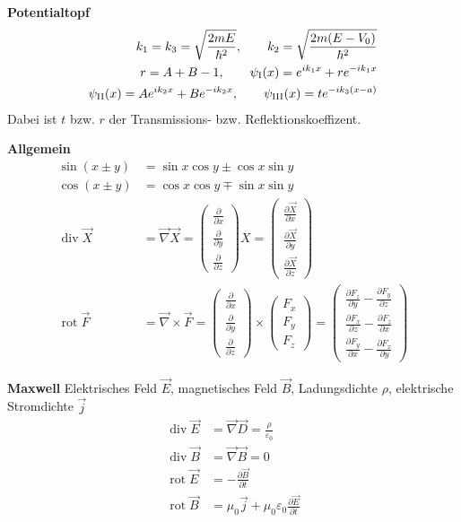 \documentclass[landscape,8pt]{scrartcl}
\newcommand{\myheading}[1]{\textbf{#1}}
\begin{document}
\begin{multicols}{3}
\myheading{Potentialtopf}
\begin{align*}
k_1 = k_3 = \sqrt{\frac{2mE}{\hbar^2}}, \qquad k_2 = \sqrt{\frac{2m(E-V_0)}{\hbar^2}} \\
r = A+B-1, \qquad \psi_\text I(x) = e^{ik_1x} + re^{-ik_1x} \\
\psi_\text{II}(x) = Ae^{ik_2x} + Be^{-ik_2x}, \qquad \psi_\text{III}(x) = t e^{-ik_3(x-a)}
\end{align*}
Dabei ist $t$ bzw. $r$ der Transmissions- bzw. Reflektionskoeffizent. 

\myheading{Allgemein}
\begin{align*}
\sin(x\pm y) &= \sin x \cos y \pm \cos x \sin y	\\
\cos(x\pm y) &= \cos x \cos y \mp \sin x \sin y \\
\operatorname{div} \vec X &= \vec \nabla \vec X 
= \begin{pmatrix}\frac{\partial}{\partial x}\\\frac{\partial}{\partial y}\\\frac{\partial}{\partial z}\end{pmatrix}X 
=\begin{pmatrix}\frac{\partial \vec X}{\partial x}\\\frac{\partial \vec X}{\partial y}\\\frac{\partial \vec X}{\partial z}\end{pmatrix} \\
\operatorname{rot}\vec F &= \vec\nabla\times \vec F =\begin{pmatrix}  \frac{\partial}{\partial x} \\  \frac{\partial}{\partial y} \\  \frac{\partial}{\partial z}\end{pmatrix}\times\begin{pmatrix}  F_x\\  F_y\\  F_z\end{pmatrix}=\begin{pmatrix}  \frac{\partial F_z}{\partial y} - \frac{\partial F_y}{\partial z} \\  \frac{\partial F_x}{\partial z} - \frac{\partial F_z}{\partial x} \\  \frac{\partial F_y}{\partial x} - \frac{\partial F_x}{\partial y}\end{pmatrix}
\end{align*}

\myheading{Maxwell}
Elektrisches Feld $\vec E$, magnetisches Feld $\vec B$, Ladungsdichte $\rho$, elektrische Stromdichte $\vec j$
\begin{align*}
\operatorname{div} \vec E &= \vec \nabla \vec D = \frac \rho {\varepsilon_0} \\
\operatorname{div} \vec B &= \vec \nabla \vec B = 0 \\
\operatorname{rot} \vec E &= -\frac{\partial \vec B}{\partial t} \\
\operatorname{rot} \vec B &= \mu_0 \vec j+ \mu_0 \varepsilon_0 \frac{\partial \vec E}{\partial t} \\
\end{align*}
 
 
 
\end{multicols}
\end{document}
